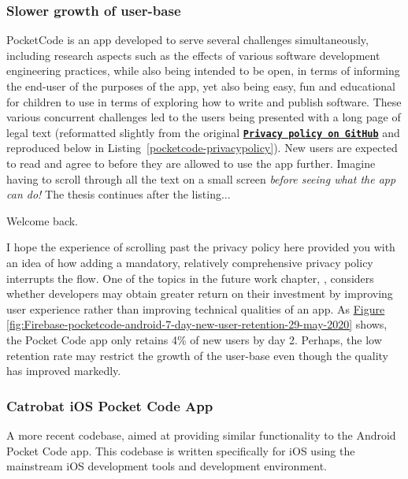 \subsubsection{Slower growth of user-base}
PocketCode is an app developed to serve several challenges simultaneously, including research aspects such as the effects of various software development engineering practices, while also being intended to be open, in terms of informing the end-user of the purposes of the app, yet also being easy, fun and educational for children to use in terms of exploring how to write and publish software. These various concurrent challenges led to the users being presented with a long page of legal text (reformatted slightly from the original \href{https://github.com/Catrobat/Catroid/blob/develop/catroid/src/main/res/values/strings.xml}{\textbf{\texttt{Privacy policy on GitHub}}} and reproduced below in Listing~\ref{pocketcode-privacypolicy}). New users are expected to read and agree to before they are allowed to use the app further. Imagine having to scroll through all the text on a small screen \emph{before seeing what the app can do!} The thesis continues after the listing...



Welcome back. 

I hope the experience of scrolling past the privacy policy here provided you with an idea of how adding a mandatory, relatively comprehensive privacy policy interrupts the flow. One of the topics in the future work chapter, \href{enhancing-quality-vs-enhancing-ux}{\textit{}}, considers whether developers may obtain greater return on their investment by improving user experience rather than improving technical qualities of an app. As \href{enhancing-quality-vs-enhancing-ux}{Figure \ref{fig:Firebase-pocketcode-android-7-day-new-user-retention-29-may-2020}} shows, the Pocket Code app only retains 4\% of new users by day 2. Perhaps, the low retention rate may restrict the growth of the user-base even though the quality has improved markedly.

\subsubsection{Catrobat iOS Pocket Code App}
A more recent codebase, aimed at providing similar functionality to the Android Pocket Code app. This codebase is written specifically for iOS using the mainstream iOS development tools and development environment. 

